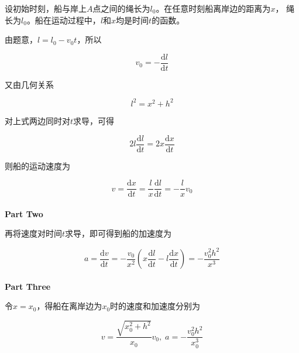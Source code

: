 \documentclass[12pt, a4paper]{article}
\newcommand{\rmd}{\mathrm{d}}
\newcommand{\deriv}[2]{\frac{\rmd #1}{\rmd #2}}
\begin{document}
    设初始时刻，船与岸上\(A\)点之间的绳长为\(l_{0}\)。在任意时刻船离岸边的距离为\(x\)，
    绳长为\(l_{0}\)。船在运动过程中，\(l\)和\(x\)均是时间\(t\)的函数。

    由题意，\(l = l_{0} - v_{0}t\)，所以

    \[
    v_{0} = - \deriv{l}{t}
    \]

    又由几何关系

    \[
    l^{2} = x^{2} + h^{2}
    \]

    对上式两边同时对\(t\)求导，可得

    \[
    2 l \deriv{l}{t} = 2x \deriv{x}{t}
    \]

    则船的运动速度为

    \[
    v = \deriv{x}{t} = \frac{l}{x} \deriv{l}{t} = -\frac{l}{x} v_{0}
    \]
    \\

    \textbf{Part Two}

    再将速度对时间\(t\)求导，即可得到船的加速度为

    \[
    a = \deriv{v}{t} = - \frac{v_{0}}{x^{2}} \left(x \deriv{l}{t} - l \deriv{x}{t}\right)
    = -\frac{v_{0}^{2} h^{2}}{x^{3}}
    \]
    \\

    \textbf{Part Three}

    令\(x=x_{0}\)，得船在离岸边为\(x_{0}\)时的速度和加速度分别为

    \[
    v = \frac{\sqrt{x_{0}^{2} + h^2}}{x_{0}} v_{0},\;
    a = -\frac{v_{0}^{2} h^{2}}{x_{0}^{3}}
    \]
\end{document}

